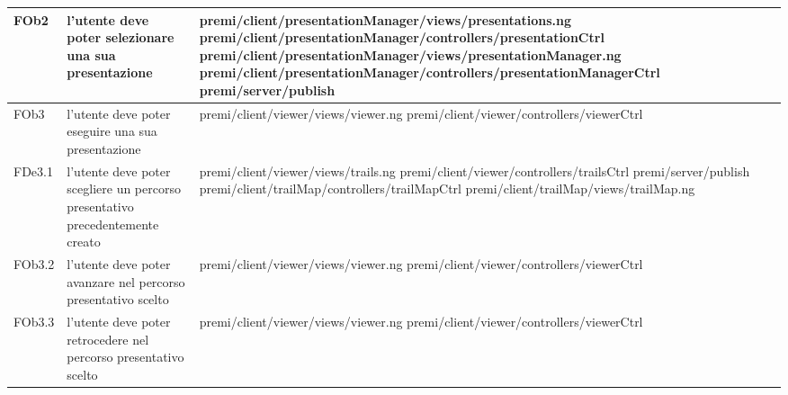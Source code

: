 \begin{longtable}{|l|p{5cm}|p{7cm}|}
\hline
FOb2 & l'utente deve poter selezionare una sua presentazione & \hspace{0pt}premi/client/presentationManager/views/presentations.ng \linebreak \linebreak premi/client/presentationManager/controllers/presentationCtrl \linebreak \linebreak premi/client/presentationManager/views/presentationManager.ng \linebreak \linebreak premi/client/presentationManager/controllers/presentationManagerCtrl \linebreak \linebreak premi/server/publish \\
\hline
FOb3 & l'utente deve poter eseguire una sua presentazione & \hspace{0pt}premi/client/viewer/views/viewer.ng \linebreak \linebreak premi/client/viewer/controllers/viewerCtrl \\
\hline
FDe3.1 & l'utente deve poter scegliere un percorso presentativo precedentemente creato & \hspace{0pt}premi/client/viewer/views/trails.ng \linebreak \linebreak premi/client/viewer/controllers/trailsCtrl \linebreak \linebreak premi/server/publish \linebreak \linebreak premi/client/trailMap/controllers/trailMapCtrl \linebreak \linebreak premi/client/trailMap/views/trailMap.ng \\
\hline
FOb3.2 & l'utente deve poter avanzare nel percorso presentativo scelto & \hspace{0pt}premi/client/viewer/views/viewer.ng \linebreak \linebreak premi/client/viewer/controllers/viewerCtrl \\
\hline
FOb3.3 & l'utente deve poter retrocedere nel percorso presentativo scelto & \hspace{0pt}premi/client/viewer/views/viewer.ng \linebreak \linebreak premi/client/viewer/controllers/viewerCtrl \\

\end{longtable}
